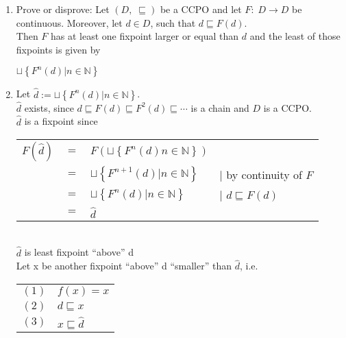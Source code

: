 \documentclass[12pt]{scrartcl}
\begin{document}
	\begin{enumerate}
	\item[] Prove or disprove: Let $\left(D,\; \sqsubseteq\right)$ be a CCPO and let $F:\; D\rightarrow D$ be continuous. Moreover, let $d\in D$, such that $d\sqsubseteq F\left(d\right)$.\\
	Then $F$ has at least one fixpoint larger or equal than $d$ and the least of those fixpoints is given by\\
	\begin{center} $\sqcup\left\{F^{n}\left(d\right)|n\in\mathbb{N}\right\}$\end{center}
	
	\item[] Let $\hat{d}:=\sqcup \left\{F^{n}\left(d\right)|n\in\mathbb{N}\right\}$.\\
	$\hat{d}$ exists, since $d\sqsubseteq F\left(d\right) \sqsubseteq F^{2}\left(d\right)\sqsubseteq \cdots$ is a chain and $D$ is a CCPO.\\
	
	$\hat{d}$ is a fixpoint since\\[0.5cm]
		\hspace*{0.5cm}\begin{tabular}{ccll}
		$F\left(\hat{d}\right)$ & $=$ & $F\left(\sqcup\left\{F^{n}\left(d\right)n\in\mathbb{N}\right\}\right)$ & \\
		& $=$ & $\sqcup\left\{F^{n+1}\left(d\right)|n\in\mathbb{N}\right\}$ & $|$ by continuity of $F$\\
		& $=$ & $\sqcup\left\{F^{n}\left(d\right)|n\in\mathbb{N}\right\}$ & $|$ $d\sqsubseteq F\left(d\right)$\\
		& $=$ & $\hat{d}$ &\\
		\end{tabular}\\[0.5cm]
		$\hat{d}$ is least fixpoint ``above'' d\\
		\hspace*{0.5cm}Let x be another fixpoint ``above'' d ``smaller'' than $\hat{d}$, i.e.\\[0.5cm]
		\hspace*{1cm}\begin{tabular}{cl}
		$\left(1\right)$ & $f\left(x\right)=x$\\
		$\left(2\right)$ & $d\sqsubseteq x$\\
		$\left(3\right)$ & $x\sqsubseteq\hat{d}$\\
		\end{tabular}\\[0.5cm]
		

\end{enumerate}
\end{document}
